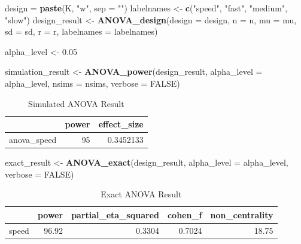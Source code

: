 \documentclass[]{book}
\newenvironment{Shaded}{\begin{snugshade}}{\end{snugshade}}
\newcommand{\DataTypeTok}[1]{\textcolor[rgb]{0.13,0.29,0.53}{#1}}
\newcommand{\FloatTok}[1]{\textcolor[rgb]{0.00,0.00,0.81}{#1}}
\newcommand{\KeywordTok}[1]{\textcolor[rgb]{0.13,0.29,0.53}{\textbf{#1}}}
\newcommand{\NormalTok}[1]{#1}
\newcommand{\OtherTok}[1]{\textcolor[rgb]{0.56,0.35,0.01}{#1}}
\newcommand{\StringTok}[1]{\textcolor[rgb]{0.31,0.60,0.02}{#1}}
\begin{document}
\begin{Shaded}
\begin{Highlighting}[]
\NormalTok{design =}\StringTok{ }\KeywordTok{paste}\NormalTok{(K, }\StringTok{"w"}\NormalTok{, }\DataTypeTok{sep =} \StringTok{""}\NormalTok{)}
\NormalTok{labelnames <-}\StringTok{ }\KeywordTok{c}\NormalTok{(}\StringTok{"speed"}\NormalTok{, }\StringTok{"fast"}\NormalTok{, }\StringTok{"medium"}\NormalTok{, }\StringTok{"slow"}\NormalTok{)}
\NormalTok{design_result <-}\StringTok{ }\KeywordTok{ANOVA_design}\NormalTok{(}\DataTypeTok{design =}\NormalTok{ design,}
                   \DataTypeTok{n =}\NormalTok{ n, }
                   \DataTypeTok{mu =}\NormalTok{ mu, }
                   \DataTypeTok{sd =}\NormalTok{ sd, }
                   \DataTypeTok{r =}\NormalTok{ r, }
                   \DataTypeTok{labelnames =}\NormalTok{ labelnames)}

\NormalTok{alpha_level <-}\StringTok{ }\FloatTok{0.05}

\NormalTok{simulation_result <-}\StringTok{ }\KeywordTok{ANOVA_power}\NormalTok{(design_result, }
                                 \DataTypeTok{alpha_level =}\NormalTok{ alpha_level, }
                                 \DataTypeTok{nsims =}\NormalTok{ nsims,}
                                 \DataTypeTok{verbose =} \OtherTok{FALSE}\NormalTok{)}
\end{Highlighting}
\end{Shaded}

\begin{table}[t]

\caption{\label{tab:unnamed-chunk-81}Simulated ANOVA Result}
\centering
\begin{tabular}{l|r|r}
\hline
  & power & effect\_size\\
\hline
anova\_speed & 95 & 0.3452133\\
\hline
\end{tabular}
\end{table}

\begin{Shaded}
\begin{Highlighting}[]
\NormalTok{exact_result <-}\StringTok{ }\KeywordTok{ANOVA_exact}\NormalTok{(design_result,}
                            \DataTypeTok{alpha_level =}\NormalTok{ alpha_level,}
                            \DataTypeTok{verbose =} \OtherTok{FALSE}\NormalTok{)}
\end{Highlighting}
\end{Shaded}

\begin{table}[t]

\caption{\label{tab:unnamed-chunk-83}Exact ANOVA Result}
\centering
\begin{tabular}{l|r|r|r|r}
\hline
  & power & partial\_eta\_squared & cohen\_f & non\_centrality\\
\hline
speed & 96.92 & 0.3304 & 0.7024 & 18.75\\
\hline
\end{tabular}
\end{table}
\end{document}
